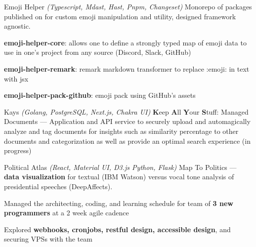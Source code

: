 

\begin{cventries}


\cventryproject
    {Emoji Helper} %
    {\emph{(Typescript, Mdast, Hast, Pnpm, Changeset)}}
    {} %
    {Monorepo of packages published on  for custom emoji manipulation and utility, designed framework agnostic.} %
    {
      \begin{cvitems} %
        \item {\textbf{emoji-helper-core}: allows one to define a strongly typed map of emoji data to use in one's project from any source (Discord, Slack, GitHub)}
        \item {\textbf{emoji-helper-remark}: remark markdown transformer to replace :emoji: in text with jsx}
        \item {\textbf{emoji-helper-pack-github}: emoji pack using GitHub's assets}
      \end{cvitems}
    }

\cventryproject
    {Kays} %
    {\emph{(Golang, PostgreSQL, Next.js, Chakra UI)}}
    {} %
    {\textbf{K}eep \textbf{A}ll \textbf{Y}our \textbf{S}tuff: Managed Documents --- Application and API service to securely upload and automagically analyze and tag documents for insights such as similarity percentage to other documents and categorization as well as provide an optimal search experience (in progress)} %
    {}

\cventryproject
    {Political Atlas} %
    {\emph{(React, Material UI, D3.js Python, Flask)}}
    {} %
    {Map To Politics --- \textbf{data visualization} for textual (IBM Watson) versus vocal tone analysis of presidential speeches (DeepAffects).} %
    {
      \begin{cvitems} %
        \item {Managed the architecting, coding, and learning schedule for team of \textbf{3 new programmers} at a 2 week agile cadence}
        \item {Explored \textbf{webhooks, cronjobs, restful design, accessible design}, and securing VPSs with the team}
      \end{cvitems}
    }


\end{cventries}
